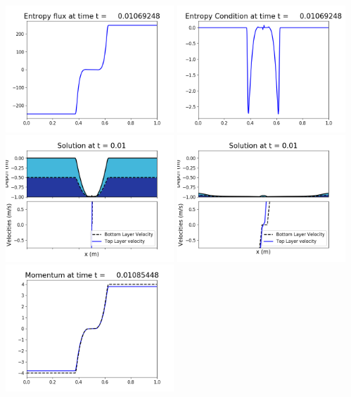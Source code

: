 \documentclass[11pt]{article}
\begin{document}
\includegraphics[width=0.475\textwidth]{frame0067fig1008.png}
\vskip 10pt 
\includegraphics[width=0.475\textwidth]{frame0067fig1009.png}
\vskip 10pt 
\includegraphics[width=0.475\textwidth]{frame0068fig1001.png}
\includegraphics[width=0.475\textwidth]{frame0068fig1002.png}
\vskip 10pt 
\includegraphics[width=0.475\textwidth]{frame0068fig1003.png}
\end{document}
